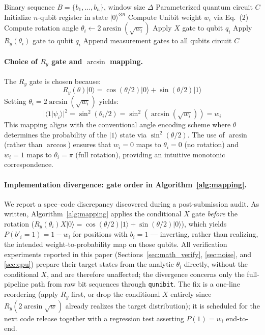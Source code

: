 ﻿\documentclass[12pt,a4paper]{article}
\begin{document}
\begin{algorithm}[H]
\caption{Unibit-to-Quantum Circuit Mapping}
\label{alg:mapping}
\begin{algorithmic}[1]
\Require Binary sequence $B = \{b_1, \dots, b_n\}$, window size $\Delta$
\Ensure Parameterized quantum circuit $C$
\State Initialize $n$-qubit register in state $|0\rangle^{\otimes n}$
    \State Compute Unibit weight $w_i$ via Eq.~(2)
    \State Compute rotation angle $\theta_i \leftarrow 2\arcsin(\sqrt{w_i})$
        \State Apply $X$ gate to qubit $q_i$
    \EndIf
    \State Apply $R_y(\theta_i)$ gate to qubit $q_i$
\EndFor
\State Append measurement gates to all qubits
\State \Return circuit $C$
\end{algorithmic}
\end{algorithm}

\paragraph{Choice of $R_y$ gate and $\arcsin$ mapping.} The $R_y$ gate is chosen because:
\begin{equation}
    R_y(\theta)|0\rangle = \cos(\theta/2)|0\rangle + \sin(\theta/2)|1\rangle
\end{equation}
Setting $\theta_i = 2\arcsin(\sqrt{w_i})$ yields:
\begin{equation}
    |\langle 1|\psi_i\rangle|^2 = \sin^2(\theta_i/2) = \sin^2(\arcsin(\sqrt{w_i})) = w_i
\end{equation}
This mapping aligns with the conventional angle encoding scheme where $\theta$ determines the probability of the $|1\rangle$ state via $\sin^2(\theta/2)$. The use of $\arcsin$ (rather than $\arccos$) ensures that $w_i = 0$ maps to $\theta_i = 0$ (no rotation) and $w_i = 1$ maps to $\theta_i = \pi$ (full rotation), providing an intuitive monotonic correspondence.

\paragraph{Implementation divergence: gate order in Algorithm~\ref{alg:mapping}.} We report a spec--code discrepancy discovered during a post-submission audit. As written, Algorithm~\ref{alg:mapping} applies the conditional $X$ gate \emph{before} the rotation ($R_y(\theta_i)X|0\rangle = \cos(\theta/2)|1\rangle + \sin(\theta/2)|0\rangle$), which yields $P(b'_i = 1) = 1 - w_i$ for positions with $b_i = 1$ --- inverting, rather than realizing, the intended weight-to-probability map on those qubits. All verification experiments reported in this paper (Sections~\ref{sec:math_verify}, \ref{sec:noise}, and \ref{sec:qpu}) prepare their target states from the analytic $\theta_i$ directly, without the conditional $X$, and are therefore unaffected; the divergence concerns only the full-pipeline path from raw bit sequences through \texttt{qunibit}. The fix is a one-line reordering (apply $R_y$ first, or drop the conditional $X$ entirely since $R_y(2\arcsin\sqrt{w})$ already realizes the target distribution); it is scheduled for the next code release together with a regression test asserting $P(1) = w_i$ end-to-end.
\end{document}
